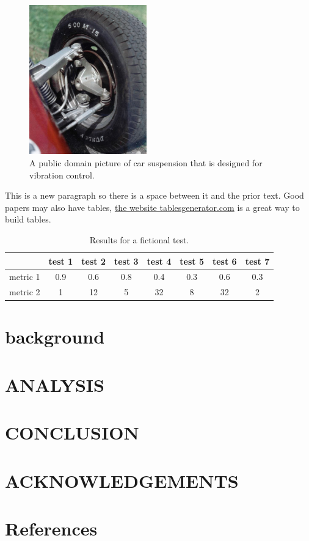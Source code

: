 \documentclass[10pt,letterpaper]{article}
\begin{document}
		\begin{figure}
			\centering
			\includegraphics[width=2in]{papernum_dow_Fig1.jpg}
			\caption{A public domain picture of car suspension that is designed for vibration control.}
			\label{fig:suspension}
		\end{figure}
		
		This is a new paragraph so there is a space between it and the prior text. Good papers may also have tables, \href{https://www.tablesgenerator.com/}{the website tablesgenerator.com} is a great way to build tables.  
		\begin{table}[]
			\centering
			\caption{Results for a fictional test.}
			\label{table:test}
			\begin{tabular}{@{}lccccccc@{}}
				\toprule
				 & test 1 & test 2 & test 3 & test 4 & test 5 & test 6 & test 7 \\ \midrule
				metric 1 & 0.9 & 0.6 & 0.8 & 0.4 & 0.3 & 0.6 & 0.3 \\
				metric 2 & 1 & 12 & 5 & 32 & 8 & 32 & 2 \\ \bottomrule
			\end{tabular}
		\end{table}
		
		
		\blindtext
	
	
	\section{background}
		\blindtext
	
	\section{ANALYSIS}
		\blindtext
	
	\section{CONCLUSION}
		\blindtext
	
	\section{ACKNOWLEDGEMENTS}
		\blindtext
	
	\section{References}
		\vspace{-1.5ex}
		
		\renewcommand{\refname}{}
		
\end{document}
